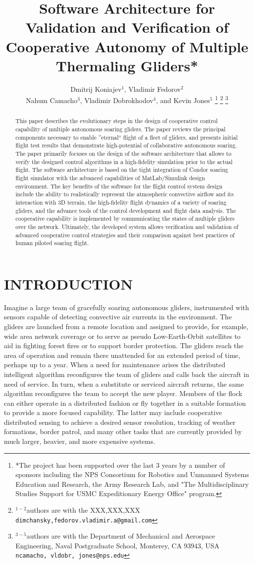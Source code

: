 \documentclass[letterpaper, 10 pt, conference]{ieeeconf}  %
\title{\LARGE \bf
Software Architecture for Validation and Verification of Cooperative Autonomy of Multiple 
Thermaling Gliders* 
}
\author{Dmitrij Koniajev$^{1}$, Vladimir Fedorov$^{2}$ \\
    Nahum Camacho$^{3}$, Vladimir Dobrokhodov$^{4}$, and Kevin Jones$^{5}$%
\thanks{*The project has been supported over the last 3 years by a number of
sponsors including the NPS Consortium for Robotics and Unmanned Systems 
Education and Research, the Army Research Lab, and "The Multidisciplinary
Studies Support for USMC Expeditionary Energy Office" program.}%
\thanks{$^{1-2}$authors are with the XXX,XXX,XXX
        {\tt\small {dimchansky,fedorov.vladimir.a}@gmail.com}}%
\thanks{$^{3-5}$authors are with the Department of Mechanical and Aerospace Engineering,
        Naval Postgraduate School, Monterey, CA 93943, USA
        {\tt\small {ncamacho, vldobr, jones}@nps.edu}}%
} %
\begin{document}
\maketitle 
\thispagestyle{empty} 
\pagestyle{empty}


\begin{abstract}
This paper describes the evolutionary steps in the design of cooperative 
control capability of multiple autonomous soaring gliders. The paper 
reviews the principal components necessary to enable ''eternal`` flight of 
a fleet of gliders, and presents initial flight test results that 
demonstrate high-potential of collaborative autonomous soaring. The paper 
primarily focuses on the design of the software architecture that allows to 
verify the designed control algorithms in a high-fidelity simulation prior 
to the actual flight. The software architecture is based on the tight 
integration of Condor soaring flight simulator with the advanced 
capabilities of MatLab/Simulink design environment. The key benefits of the 
software for the flight control system design include the ability to 
realistically represent the atmospheric convective airflow and its 
interaction with 3D terrain, the high-fidelity flight dynamics of a variety 
of soaring gliders, and the advance tools of the control development and 
flight data analysis. The cooperative capability is implemented by 
communicating the states of multiple gliders over the network. Ultimately, 
the developed system allows verification and validation of advanced 
cooperative control strategies and their comparison against best practices 
of human piloted soaring flight.
\end{abstract}


\section{INTRODUCTION}

Imagine a large team of gracefully soaring autonomous gliders, instrumented 
with sensors capable of detecting convective air currents in the environment. 
The gliders are launched from a remote location and assigned to provide, for 
example, wide area network coverage or to serve as pseudo Low-Earth-Orbit 
satellites to aid in fighting forest fires or to support border protection. 
The gliders reach the area of operation and remain there unattended for an 
extended period of time, perhaps up to a year. When a need for maintenance 
arises the distributed intelligent algorithm reconfigures the team of gliders 
and calls back the aircraft in need of service. In turn, when a substitute or 
serviced aircraft returns, the same algorithm reconfigures the team to accept 
the new player. Members of the flock can either operate in a distributed 
fashion or fly together in a suitable formation to provide a more focused 
capability. The latter may include cooperative distributed sensing to achieve 
a desired sensor resolution, tracking of weather formations, border patrol, 
and many other tasks that are currently provided by much larger, heavier, and 
more expensive systems.
\end{document}
